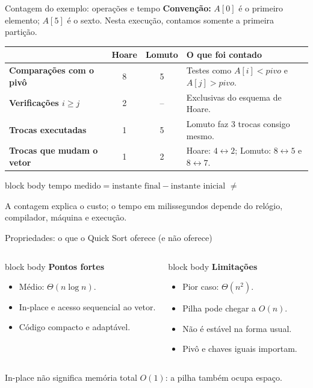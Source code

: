 \documentclass[aspectratio=169,11pt]{beamer}
\newcommand{\citep}[1]{{\color{MidGray}\tiny\cite{#1}}}
\newcommand{\softbox}[2]{%
  \begin{beamercolorbox}[wd=\linewidth,sep=.8em,rounded=false]{block body}
    {\bfseries #1}\par\vspace{.25em}#2
  \end{beamercolorbox}
}
\begin{document}
\begin{frame}{Contagem do exemplo: operações e tempo}
  \small
  \textbf{Convenção:} \(A[0]\) é o primeiro elemento; \(A[5]\) é o sexto.
  Nesta execução, contamos somente a primeira partição.
  \vspace{.25em}
  \begin{tabularx}{\textwidth}{>{\bfseries}p{2.6cm} c c X}
    \toprule
    & Hoare & Lomuto & O que foi contado \\
    \midrule
    Comparações com o pivô & 8 & 5 & Testes como \(A[i]<pivo\) e \(A[j]>pivo\). \\
    Verificações \(i\geq j\) & 2 & -- & Exclusivas do esquema de Hoare. \\
    Trocas executadas & 1 & 5 & Lomuto faz 3 trocas consigo mesmo. \\
    Trocas que mudam o vetor & 1 & 2 & Hoare: \(4\leftrightarrow2\); Lomuto: \(8\leftrightarrow5\) e \(8\leftrightarrow7\). \\
    \bottomrule
  \end{tabularx}
  \vspace{.45em}
  \begin{beamercolorbox}[wd=\linewidth,sep=.55em]{block body}
    \centering
    \(\text{tempo medido}=\text{instante final}-\text{instante inicial}\)
    \quad\(\neq\quad\)
  \end{beamercolorbox}
  \scriptsize A contagem explica o custo; o tempo em milissegundos depende do relógio, compilador, máquina e execução.
\end{frame}

\begin{frame}{Propriedades: o que o Quick Sort oferece (e não oferece)}
  \begin{columns}[T,onlytextwidth]
      \softbox{Pontos fortes}{\begin{itemize}
        \item Médio: \(\Theta(n\log n)\).
        \item In-place e acesso sequencial ao vetor.
        \item Código compacto e adaptável.
      \end{itemize}}
      \softbox{Limitações}{\begin{itemize}
        \item Pior caso: \(\Theta(n^2)\).
        \item Pilha pode chegar a \(O(n)\).
        \item Não é estável na forma usual.
        \item Pivô e chaves iguais importam.
      \end{itemize}}
  \end{columns}
  \vspace{.6em}
  \begin{center}
    \small In-place não significa memória total \(O(1)\): a pilha também ocupa espaço.
  \end{center}
  \citep{cormen2022,knuth1998,sedgwick2011}
\end{frame}
\end{document}
